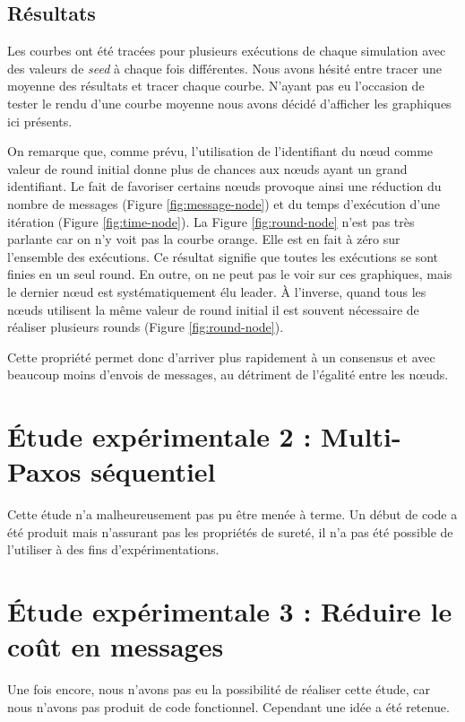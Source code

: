 \documentclass[french]{article}
\begin{document}
\subsection{Résultats}

Les courbes ont été tracées pour plusieurs exécutions de chaque simulation avec des valeurs de \emph{seed} à chaque fois différentes.
Nous avons hésité entre tracer une moyenne des résultats et tracer chaque courbe.
N'ayant pas eu l'occasion de tester le rendu d'une courbe moyenne nous avons décidé d'afficher les graphiques ici présents.



On remarque que, comme prévu, l'utilisation de l'identifiant du nœud comme valeur de round initial donne plus de chances aux nœuds ayant un grand identifiant.
Le fait de favoriser certains nœuds provoque ainsi une réduction du nombre de messages (Figure \ref{fig:message-node}) et du temps d'exécution d'une itération (Figure \ref{fig:time-node}).
La Figure \ref{fig:round-node} n'est pas très parlante car on n'y voit pas la courbe orange. Elle est en fait à zéro sur l'ensemble des exécutions.
Ce résultat signifie que toutes les exécutions se sont finies en un seul round.
En outre, on ne peut pas le voir sur ces graphiques, mais le dernier nœud est systématiquement élu leader.
À l'inverse, quand tous les nœuds utilisent la même valeur de round initial il est souvent nécessaire de réaliser plusieurs rounds (Figure \ref{fig:round-node}).


Cette propriété permet donc d'arriver plus rapidement à un consensus et avec beaucoup moins d'envois de messages,
au détriment de l'égalité entre les nœuds.





\section{Étude expérimentale 2 : Multi-Paxos séquentiel}

Cette étude n'a malheureusement pas pu être menée à terme.
Un début de code a été produit mais n'assurant pas les propriétés de sureté, il n'a pas été possible de l'utiliser à des fins d'expérimentations.

\section{Étude expérimentale 3 : Réduire le coût en messages}

Une fois encore, nous n'avons pas eu la possibilité de réaliser cette étude, car nous n'avons pas produit de code fonctionnel.
Cependant une idée a été retenue.
\end{document}
